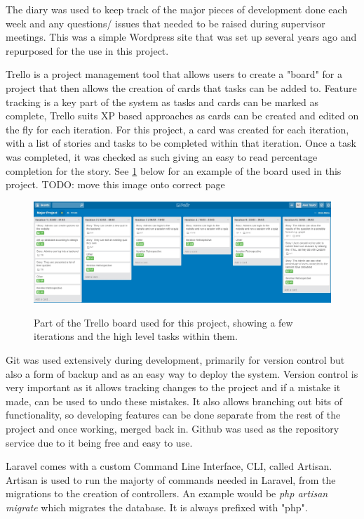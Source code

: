 The diary was used to keep track of the major pieces of development done each week and any questions/ issues that needed to be raised during supervisor meetings. This was a simple Wordpress site that was set up several years ago and repurposed for the use in this project.

Trello is a project management tool that allows users to create a "board" for a project that then allows the creation of cards that tasks can be added to\cite{trello}. Feature tracking is a key part of the system as tasks and cards can be marked as complete, Trello suits XP based approaches as cards can be created and edited on the fly for each iteration. For this project, a card was created for each iteration, with a list of stories and tasks to be completed within that iteration. Once a task was completed, it was checked as such giving an easy to read percentage completion for the story. See \ref{fig:trello-board} below for an example of the board used in this project. TODO: move this image onto correct page

\begin{figure}
	\caption{Part of the Trello board used for this project, showing a few iterations and the high level tasks within them.}
	\includegraphics[width=\textwidth]{Chapter2/trello-board}
	\label{fig:trello-board}
\end{figure}
\newpage

Git was used extensively during development, primarily for version control but also a form of backup and as an easy way to deploy the system. Version control is very important as it allows tracking changes to the project and if a mistake it made, can be used to undo these mistakes. It also allows branching out bits of functionality, so developing features can be done separate from the rest of the project and once working, merged back in. Github was used as the repository service due to it being free and easy to use\cite{github}.

Laravel comes with a custom Command Line Interface, CLI, called Artisan\cite{artisan}. Artisan is used to run the majorty of commands needed in Laravel, from the migrations to the creation of controllers. An example would be \textit{php artisan migrate} which migrates the database. It is always prefixed with "php".
\newpage

